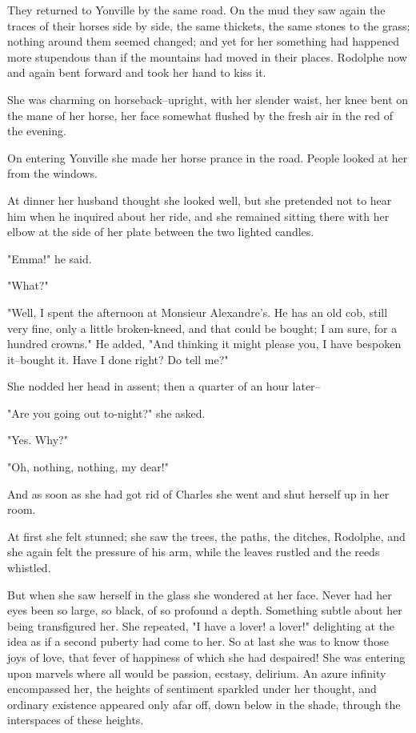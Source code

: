 \documentclass{tufte-book}
\begin{document}
They returned to Yonville by the same road. On the mud they saw again
the traces of their horses side by side, the same thickets, the same
stones to the grass; nothing around them seemed changed; and yet for her
something had happened more stupendous than if the mountains had moved
in their places. Rodolphe now and again bent forward and took her hand
to kiss it.

She was charming on horseback--upright, with her slender waist, her knee
bent on the mane of her horse, her face somewhat flushed by the fresh
air in the red of the evening.

On entering Yonville she made her horse prance in the road. People
looked at her from the windows.

At dinner her husband thought she looked well, but she pretended not to
hear him when he inquired about her ride, and she remained sitting there
with her elbow at the side of her plate between the two lighted candles.

"Emma!" he said.

"What?"

"Well, I spent the afternoon at Monsieur Alexandre's. He has an old cob,
still very fine, only a little broken-kneed, and that could be bought; I
am sure, for a hundred crowns." He added, "And thinking it might please
you, I have bespoken it--bought it. Have I done right? Do tell me?"

She nodded her head in assent; then a quarter of an hour later--

"Are you going out to-night?" she asked.

"Yes. Why?"

"Oh, nothing, nothing, my dear!"

And as soon as she had got rid of Charles she went and shut herself up
in her room.

At first she felt stunned; she saw the trees, the paths, the ditches,
Rodolphe, and she again felt the pressure of his arm, while the leaves
rustled and the reeds whistled.

But when she saw herself in the glass she wondered at her face. Never
had her eyes been so large, so black, of so profound a depth. Something
subtle about her being transfigured her. She repeated, "I have a lover!
a lover!" delighting at the idea as if a second puberty had come to her.
So at last she was to know those joys of love, that fever of happiness
of which she had despaired! She was entering upon marvels where all
would be passion, ecstasy, delirium. An azure infinity encompassed
her, the heights of sentiment sparkled under her thought, and ordinary
existence appeared only afar off, down below in the shade, through the
interspaces of these heights.
\end{document}
